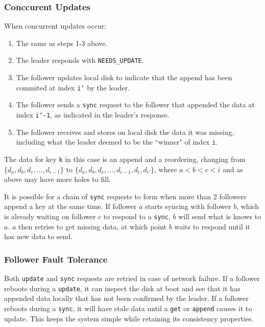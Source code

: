 \documentclass[11pt,english,twocolumn]{article}
\begin{document}
\subsubsection{Conccurent Updates}
When concurrent updates occur:

\begin{enumerate}
	\item The same as steps 1-3 above.
	\item The leader responds with \texttt{NEEDS\_UPDATE}.
	\item The follower updates local disk to indicate that the append has
		been commited at index \texttt{i`} by the leader.
	\item The follower sends a \texttt{sync} request to the follower that
		appended the data at index \texttt{i`-1}, as indicated in the
		leader's response.
	\item The follower receives and stores on local disk the data it was
		missing, including what the leader deemed to be the ``winner" of
		index \texttt{i}.
\end{enumerate}

The data for key \texttt{k} in this case is an append and a reordering,
changing from $\{d_a, d_b, d_c, ..., d_{i-1}\}$ to $\{d_a, d_b, d_c, ...,
d_{i-1}, d_i, d_{i'}\}$, where $a < b < c < i$ and as above may have more holes
to fill.

It is possible for a chain of \texttt{sync} requests to form when more than 2
followers append a key at the same time. If follower $a$ starts syncing with
follower $b$, which is already waiting on follower $c$ to respond to a
\texttt{sync}, $b$ will send what is knows to $a$. $a$ then retries to get
missing data, at which point $b$ waits to respond until it has new data to send.

\subsubsection{Follower Fault Tolerance}
Both \texttt{update} and \texttt{sync} requests are retried in case of network
failure. If a follower reboots during a \texttt{update}, it can inspect the disk
at boot and see that it has appended data locally that has not been confirmed by
the leader. If a follower reboots during a \texttt{sync}, it will have stale
data until a \texttt{get} or \texttt{append} causes it to update. This keeps the
system simple while retaining its consistency properties.
\end{document}
